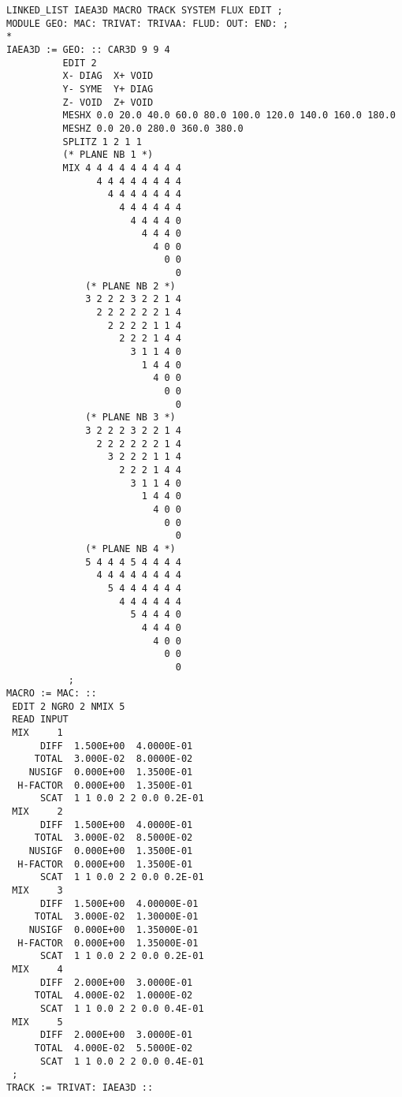 \begin{verbatim}
LINKED_LIST IAEA3D MACRO TRACK SYSTEM FLUX EDIT ;
MODULE GEO: MAC: TRIVAT: TRIVAA: FLUD: OUT: END: ;
*
IAEA3D := GEO: :: CAR3D 9 9 4
          EDIT 2
          X- DIAG  X+ VOID 
          Y- SYME  Y+ DIAG 
          Z- VOID  Z+ VOID 
          MESHX 0.0 20.0 40.0 60.0 80.0 100.0 120.0 140.0 160.0 180.0 
          MESHZ 0.0 20.0 280.0 360.0 380.0 
          SPLITZ 1 2 1 1
          (* PLANE NB 1 *) 
          MIX 4 4 4 4 4 4 4 4 4 
                4 4 4 4 4 4 4 4 
                  4 4 4 4 4 4 4 
                    4 4 4 4 4 4 
                      4 4 4 4 0 
                        4 4 4 0 
                          4 0 0 
                            0 0 
                              0 
              (* PLANE NB 2 *) 
              3 2 2 2 3 2 2 1 4 
                2 2 2 2 2 2 1 4 
                  2 2 2 2 1 1 4 
                    2 2 2 1 4 4 
                      3 1 1 4 0 
                        1 4 4 0 
                          4 0 0 
                            0 0 
                              0 
              (* PLANE NB 3 *) 
              3 2 2 2 3 2 2 1 4 
                2 2 2 2 2 2 1 4 
                  3 2 2 2 1 1 4 
                    2 2 2 1 4 4 
                      3 1 1 4 0 
                        1 4 4 0 
                          4 0 0 
                            0 0 
                              0 
              (* PLANE NB 4 *) 
              5 4 4 4 5 4 4 4 4 
                4 4 4 4 4 4 4 4 
                  5 4 4 4 4 4 4 
                    4 4 4 4 4 4 
                      5 4 4 4 0 
                        4 4 4 0 
                          4 0 0 
                            0 0 
                              0 
           ;
MACRO := MAC: ::
 EDIT 2 NGRO 2 NMIX 5
 READ INPUT
 MIX     1
      DIFF  1.500E+00  4.0000E-01
     TOTAL  3.000E-02  8.0000E-02
    NUSIGF  0.000E+00  1.3500E-01
  H-FACTOR  0.000E+00  1.3500E-01
      SCAT  1 1 0.0 2 2 0.0 0.2E-01
 MIX     2
      DIFF  1.500E+00  4.0000E-01
     TOTAL  3.000E-02  8.5000E-02
    NUSIGF  0.000E+00  1.3500E-01
  H-FACTOR  0.000E+00  1.3500E-01
      SCAT  1 1 0.0 2 2 0.0 0.2E-01
 MIX     3
      DIFF  1.500E+00  4.00000E-01
     TOTAL  3.000E-02  1.30000E-01
    NUSIGF  0.000E+00  1.35000E-01
  H-FACTOR  0.000E+00  1.35000E-01
      SCAT  1 1 0.0 2 2 0.0 0.2E-01
 MIX     4
      DIFF  2.000E+00  3.0000E-01
     TOTAL  4.000E-02  1.0000E-02
      SCAT  1 1 0.0 2 2 0.0 0.4E-01
 MIX     5
      DIFF  2.000E+00  3.0000E-01
     TOTAL  4.000E-02  5.5000E-02
      SCAT  1 1 0.0 2 2 0.0 0.4E-01
 ;
TRACK := TRIVAT: IAEA3D ::

\end{verbatim}
